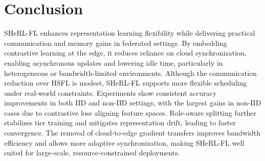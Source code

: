 \documentclass[letterpaper]{article} %
\begin{document}
\section{Conclusion}
SHeRL-FL enhances representation learning flexibility while delivering practical communication and memory gains in federated settings. By embedding contrastive learning at the edge, it reduces reliance on cloud synchronization, enabling asynchronous updates and lowering idle time, particularly in heterogeneous or bandwidth-limited environments. Although the communication reduction over HSFL is modest, SHeRL-FL supports more flexible scheduling under real-world constraints. Experiments show consistent accuracy improvements in both IID and non-IID settings, with the largest gains in non-IID cases due to contrastive loss aligning feature spaces. Role-aware splitting further stabilizes tier training and mitigates representation drift, leading to faster convergence. The removal of cloud-to-edge gradient transfers improves bandwidth efficiency and allows more adaptive synchronization, making SHeRL-FL well suited for large-scale, resource-constrained deployments.






\end{document}
